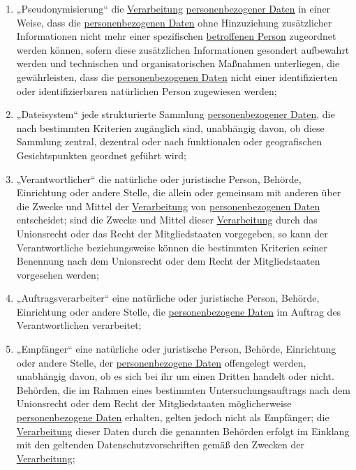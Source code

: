 \begin{enumerate}
  \item „Pseudonymisierung“ die \hyperref[itm:04-2]{Verarbeitung} \hyperref[itm:04-1]{personenbezogener Daten} in einer Weise, dass die \hyperref[itm:04-1]{personenbezogenen Daten}
   ohne Hinzuziehung zusätzlicher Informationen nicht mehr einer spezifischen \hyperref[itm:04-1]{betroffenen Person} zugeordnet werden
   können, sofern diese zusätzlichen Informationen gesondert aufbewahrt werden und technischen und organisatorischen
   Maßnahmen unterliegen, die gewährleisten, dass die \hyperref[itm:04-1]{personenbezogenen Daten} nicht einer identifizierten oder
   identifizierbaren natürlichen Person zugewiesen werden;
  \label{itm:04-5}

  \item „Dateisystem“ jede strukturierte Sammlung \hyperref[itm:04-1]{personenbezogener Daten}, die nach bestimmten Kriterien zugänglich
   sind, unabhängig davon, ob diese Sammlung zentral, dezentral oder nach funktionalen oder geografischen
   Gesichtspunkten geordnet geführt wird;
  \label{itm:04-6}

  \item „Verantwortlicher“ die natürliche oder juristische Person, Behörde, Einrichtung oder andere Stelle, die allein
   oder gemeinsam mit anderen über die Zwecke und Mittel der \hyperref[itm:04-2]{Verarbeitung} von \hyperref[itm:04-1]{personenbezogenen Daten} entscheidet; sind
   die Zwecke und Mittel dieser \hyperref[itm:04-2]{Verarbeitung} durch das Unionsrecht oder das Recht der Mitgliedstaaten vorgegeben, so
   kann der Verantwortliche beziehungsweise können die bestimmten Kriterien seiner Benennung nach dem Unionsrecht oder
   dem Recht der Mitgliedstaaten vorgesehen werden;
  \label{itm:04-7}

  \item „Auftragsverarbeiter“ eine natürliche oder juristische Person, Behörde, Einrichtung oder andere Stelle, die
   \hyperref[itm:04-1]{personenbezogene Daten} im Auftrag des Verantwortlichen verarbeitet;
  \label{itm:04-8}

  \item „Empfänger“ eine natürliche oder juristische Person, Behörde, Einrichtung oder andere Stelle, der
   \hyperref[itm:04-1]{personenbezogene Daten} offengelegt werden, unabhängig davon, ob es sich bei ihr um einen Dritten handelt oder nicht.
   Behörden, die im Rahmen eines bestimmten Untersuchungsauftrags nach dem Unionsrecht oder dem Recht der
   Mitgliedstaaten möglicherweise \hyperref[itm:04-1]{personenbezogene Daten} erhalten, gelten jedoch nicht als Empfänger; die \hyperref[itm:04-2]{Verarbeitung}
   dieser Daten durch die genannten Behörden erfolgt im Einklang mit den geltenden Datenschutzvorschriften gemäß den
   Zwecken der \hyperref[itm:04-2]{Verarbeitung};
  \label{itm:04-9}


\end{enumerate}
